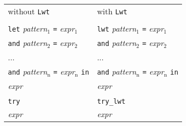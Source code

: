 \noindent
\begin{tabular}{p{}p{}}
\multicolumn{1}{l}{\begin{minipage}{0.5\textwidth}\centering  without {\tt Lwt}                                                               \end{minipage}}&\multicolumn{1}{l}{\begin{minipage}{0.5\textwidth}\centering  with {\tt Lwt}                                                                      \end{minipage}}\\
                                                                                  &                                                                                      \\
 {\tt let} \emph{pattern$_{\mbox{1}}$} {\tt =} \emph{expr$_{\mbox{1}}$}                                 & {\tt lwt} \emph{pattern$_{\mbox{1}}$} {\tt =} \emph{expr$_{\mbox{1}}$}                                     \\
 {\tt and} \emph{pattern$_{\mbox{2}}$} {\tt =} \emph{expr$_{\mbox{2}}$}                                 & {\tt and} \emph{pattern$_{\mbox{2}}$} {\tt =} \emph{expr$_{\mbox{2}}$}                                     \\
 ...                                                                              & ...                                                                                  \\
 {\tt and} \emph{pattern$_{\mbox{n}}$} {\tt =} \emph{expr$_{\mbox{n}}$} {\tt in}                        & {\tt and} \emph{pattern$_{\mbox{n}}$} {\tt =} \emph{expr$_{\mbox{n}}$} {\tt in}                            \\
 \emph{expr}                                                                         & \emph{expr}                                                                             \\
                                                                                  &                                                                                      \\
 {\tt try}                                                                        & {\tt try\_lwt}                                                                        \\
 \emph{ expr}                                                                        & \emph{ expr}                                                                            \\

\end{tabular}
